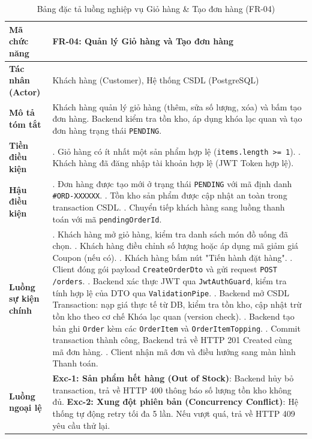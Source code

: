 \documentclass[a4paper]{article}
\begin{document}
\begin{table}[H]
\centering
\small
\begin{tabular}{|>{\raggedright\arraybackslash}p{3.4cm}|>{\raggedright\arraybackslash}p{12.2cm}|}
\hline
\textbf{Mã chức năng} & \textbf{FR-04: Quản lý Giỏ hàng và Tạo đơn hàng} \\ \hline
\textbf{Tác nhân (Actor)} & Khách hàng (Customer), Hệ thống CSDL (PostgreSQL) \\ \hline
\textbf{Mô tả tóm tắt} & Khách hàng quản lý giỏ hàng (thêm, sửa số lượng, xóa) và bấm tạo đơn hàng. Backend kiểm tra tồn kho, áp dụng khóa lạc quan và tạo đơn hàng trạng thái \texttt{PENDING}. \\ \hline
\textbf{Tiền điều kiện} & 1. Giỏ hàng có ít nhất một sản phẩm hợp lệ (\texttt{items.length >= 1}). \newline 2. Khách hàng đã đăng nhập tài khoản hợp lệ (JWT Token hợp lệ). \\ \hline
\textbf{Hậu điều kiện} & 1. Đơn hàng được tạo mới ở trạng thái \texttt{PENDING} với mã định danh \texttt{\#ORD-XXXXXX}. \newline 2. Tồn kho sản phẩm được cập nhật an toàn trong transaction CSDL. \newline 3. Chuyển tiếp khách hàng sang luồng thanh toán với mã \texttt{pendingOrderId}. \\ \hline
\textbf{Luồng sự kiện chính} & 
1. Khách hàng mở giỏ hàng, kiểm tra danh sách món đồ uống đã chọn. \newline
2. Khách hàng điều chỉnh số lượng hoặc áp dụng mã giảm giá Coupon (nếu có). \newline
3. Khách hàng bấm nút "Tiến hành đặt hàng". \newline
4. Client đóng gói payload \texttt{CreateOrderDto} và gửi request \texttt{POST /orders}. \newline
5. Backend xác thực JWT qua \texttt{JwtAuthGuard}, kiểm tra tính hợp lệ của DTO qua \texttt{ValidationPipe}. \newline
6. Backend mở CSDL Transaction: nạp giá thực tế từ DB, kiểm tra tồn kho, cập nhật trừ tồn kho theo cơ chế Khóa lạc quan (version check). \newline
7. Backend tạo bản ghi \texttt{Order} kèm các \texttt{OrderItem} và \texttt{OrderItemTopping}. \newline
8. Commit transaction thành công, Backend trả về HTTP 201 Created cùng mã đơn hàng. \newline
9. Client nhận mã đơn và điều hướng sang màn hình Thanh toán. \\ \hline
\textbf{Luồng ngoại lệ} & 
\textbf{Exc-1: Sản phẩm hết hàng (Out of Stock)}: Backend hủy bỏ transaction, trả về HTTP 400 thông báo số lượng tồn kho không đủ. \newline
\textbf{Exc-2: Xung đột phiên bản (Concurrency Conflict)}: Hệ thống tự động retry tối đa 5 lần. Nếu vượt quá, trả về HTTP 409 yêu cầu thử lại. \\ \hline
\end{tabular}
\caption{Bảng đặc tả luồng nghiệp vụ Giỏ hàng \& Tạo đơn hàng (FR-04)}
\label{tab:fr04_order}
\end{table}
\end{document}
